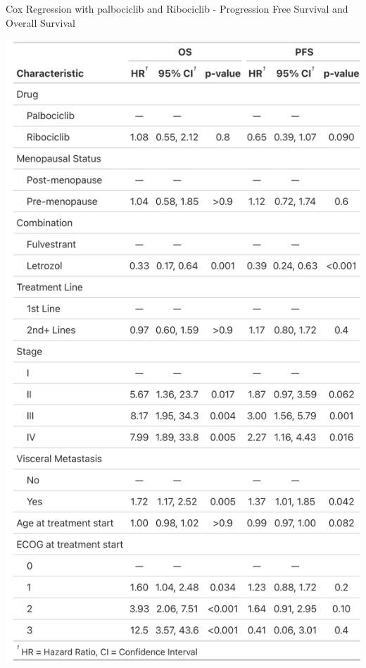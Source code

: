 \begin{table}[ht]
  \centering
  \caption{Cox Regression with palbociclib and Ribociclib - Progression Free Survival and Overall Survival}\label{tab:cox} 
  \includegraphics[scale=0.20]{figures/cox_both.png}%

\end{table}

